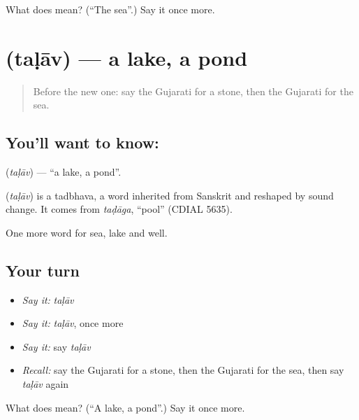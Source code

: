 \begin{tcolorbox}[breakable,colback=teal!4,colframe=teal!35!black,title={Before you move on}]
What does  mean? (\textquotedblleft{}The sea\textquotedblright{}.) Say it once more.
\end{tcolorbox}
\section[\texorpdfstring{\gu{તળાવ} (taḷāv)}{તળાવ (taḷāv)}]{ (taḷāv) — a lake, a pond}

\label{lesson:GU-C65-lake}



\begin{quote}
Before the new one: say the Gujarati for a stone, then the Gujarati for the sea.
\end{quote}

\subsection*{You'll want to know: }
\textbf{} (\emph{taḷāv}) — \textquotedblleft{}a lake, a pond\textquotedblright{}.

\begin{cousinweb}
\textbf{} (\emph{taḷāv}) is a tadbhava, a word inherited from Sanskrit and reshaped by sound change. It comes from \emph{taḍāga}, \textquotedblleft{}pool\textquotedblright{} (CDIAL 5635).
\end{cousinweb}

\begin{grammarlens}[title={What you've built}]
One more word for sea, lake and well.
\end{grammarlens}

\subsection*{Your turn}
\begin{itemize}
\raggedright
  \item \emph{Say it:} \emph{taḷāv}
  \item \emph{Say it:} \emph{taḷāv}, once more
  \item \emph{Say it:} say \emph{taḷāv}
  \item \emph{Recall:} say the Gujarati for a stone, then the Gujarati for the sea, then say \emph{taḷāv} again
\end{itemize}

\begin{tcolorbox}[breakable,colback=teal!4,colframe=teal!35!black,title={Before you move on}]
What does  mean? (\textquotedblleft{}A lake, a pond\textquotedblright{}.) Say it once more.
\end{tcolorbox}
